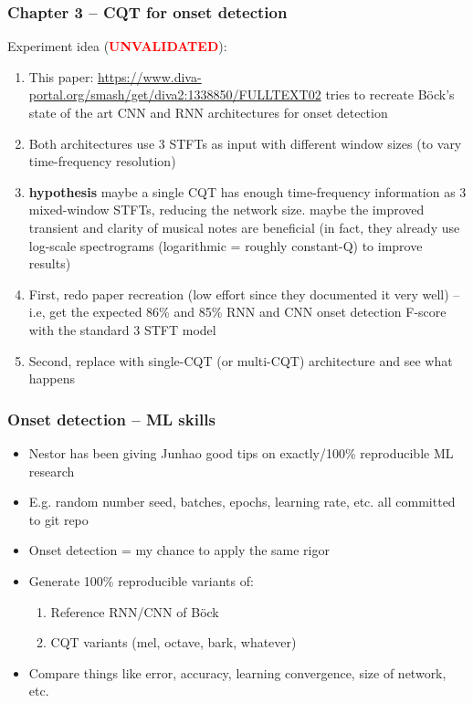 \documentclass[usenames,dvipsnames]{beamer}
\begin{document}
\begin{frame}
	\frametitle{Chapter 3 -- CQT for onset detection}
	Experiment idea (\textcolor{red}{\textbf{UNVALIDATED}}):
	\begin{enumerate}
		\item
			This paper: \href{https://www.diva-portal.org/smash/get/diva2:1338850/FULLTEXT02}{https://www.diva-portal.org/smash/get/diva2:1338850/FULLTEXT02} tries to recreate B{\"o}ck's state of the art CNN and RNN architectures for onset detection
		\item
			Both architectures use 3 STFTs as input with different window sizes (to vary time-frequency resolution)
		\item
			\textbf{hypothesis} maybe a single CQT has enough time-frequency information as 3 mixed-window STFTs, reducing the network size. maybe the improved transient and clarity of musical notes are beneficial (in fact, they already use log-scale spectrograms (logarithmic = roughly constant-Q) to improve results)
		\item
			First, redo paper recreation (low effort since they documented it very well) -- i.e, get the expected 86\% and 85\% RNN and CNN onset detection F-score with the standard 3 STFT model
		\item
			Second, replace with single-CQT (or multi-CQT) architecture and see what happens
	\end{enumerate}
\end{frame}

\begin{frame}
	\frametitle{Onset detection -- ML skills}
	\begin{itemize}
		\item
			Nestor has been giving Junhao good tips on exactly/100\% reproducible ML research
		\item
			E.g. random number seed, batches, epochs, learning rate, etc. all committed to git repo
		\item
			Onset detection = my chance to apply the same rigor
		\item
			Generate 100\% reproducible variants of:
			\begin{enumerate}
				\item
					Reference RNN/CNN of B{\"o}ck
				\item
					CQT variants (mel, octave, bark, whatever)
			\end{enumerate}
		\item
			Compare things like error, accuracy, learning convergence, size of network, etc.
	\end{itemize}
\end{frame}
\end{document}
